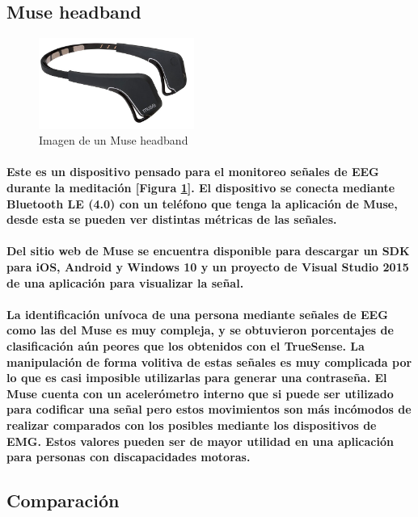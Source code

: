 \documentclass{article}
\begin{document}
\subsection{Muse headband}
\begin{figure}[ht]
    \centering
    \includegraphics[width=2in]{museheadband.jpg}%
    \caption{Imagen de un Muse headband}
    \label{fig:muse}
\end{figure}
\paragraph{
Este es un dispositivo pensado para el monitoreo señales de EEG durante la meditación [Figura \ref{fig:muse}]. El dispositivo se conecta mediante Bluetooth LE (4.0) con un teléfono que tenga la aplicación de Muse, desde esta se pueden ver distintas métricas de las señales.}
\paragraph{
Del sitio web de Muse se encuentra disponible para descargar un SDK para iOS, Android y Windows 10 y un proyecto de Visual Studio 2015 de una aplicación para visualizar la señal.
}

\paragraph{
La identificación unívoca de una persona mediante señales de EEG como las del Muse es muy compleja, y se obtuvieron porcentajes de clasificación aún peores que los obtenidos con el TrueSense. La manipulación de forma volitiva de estas señales es muy complicada por lo que es casi imposible utilizarlas para generar una contraseña. El Muse cuenta con un acelerómetro interno que si puede ser utilizado para codificar una señal pero estos movimientos son más incómodos de realizar comparados con los posibles mediante los dispositivos de EMG. Estos valores pueden ser de mayor utilidad en una aplicación para personas con discapacidades motoras.
}

\subsection{Comparación}
\end{document}
